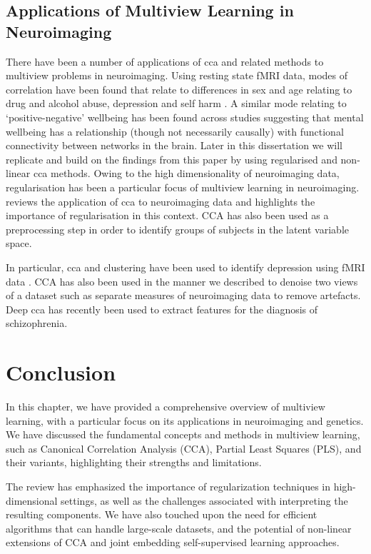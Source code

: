 \subsection{Applications of Multiview Learning in Neuroimaging}

There have been a number of applications of \acrshort{cca} and related methods to multiview problems in neuroimaging.
Using resting state fMRI data, modes of correlation have been found that relate to differences in sex and age relating to drug and alcohol abuse, depression and self harm \citep{mihalik2019brain}.
A similar mode relating to `positive-negative' wellbeing has been found across studies \citep{smith2015positive} suggesting that mental wellbeing has a relationship (though not necessarily causally) with functional connectivity between networks in the brain.
Later in this dissertation we will replicate and build on the findings from this paper by using regularised and non-linear \acrshort{cca} methods.
Owing to the high dimensionality of neuroimaging data, regularisation has been a particular focus of multiview learning in neuroimaging. \citet{mihalik2022canonical} reviews the application of \acrshort{cca} to neuroimaging data and highlights the importance of regularisation in this context. \citet{bilenko2016pyrcca} 
CCA has also been used as a preprocessing step in order to identify groups of subjects in the latent variable space.

In particular, \acrshort{cca} and clustering have been used to identify depression using fMRI data \citep{dinga2019evaluating,drysdale2017resting}.
CCA has also been used in the manner we described to denoise two \gls{views} of a dataset such as separate measures of neuroimaging data \citep{zhuang2020technical} to remove artefacts.
Deep \acrshort{cca} has recently been used to extract features for the diagnosis of schizophrenia\citep{qi2016deep}.

\section{Conclusion}

In this chapter, we have provided a comprehensive overview of multiview learning, with a particular focus on its applications in neuroimaging and genetics. We have discussed the fundamental concepts and methods in multiview learning, such as Canonical Correlation Analysis (CCA), Partial Least Squares (PLS), and their variants, highlighting their strengths and limitations.

The review has emphasized the importance of regularization techniques in high-dimensional settings, as well as the challenges associated with interpreting the resulting components. We have also touched upon the need for efficient algorithms that can handle large-scale datasets, and the potential of non-linear extensions of CCA and joint embedding self-supervised learning approaches.

